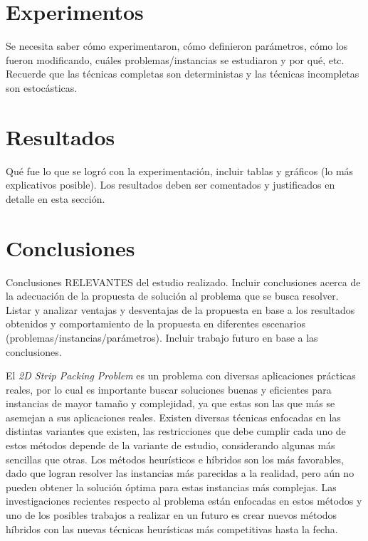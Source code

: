 \documentclass[letter, 10pt]{article}
\begin{document}
\section{Experimentos}

Se necesita saber c\'omo experimentaron, c\'omo definieron par\'ametros, 
c\'omo los fueron modificando, cu\'ales problemas/instancias se estudiaron y por qu\'e, etc. Recuerde que las t\'ecnicas completas son deterministas y las t\'ecnicas incompletas son estoc\'asticas.

\section{Resultados}

Qu\'e fue lo que se logr\'o con la experimentaci\'on, incluir tablas y gr\'aficos (lo m\'as explicativos posible). Los resultados deben ser comentados y justificados en detalle en esta secci\'on.

\section{Conclusiones}

Conclusiones RELEVANTES del estudio realizado. Incluir conclusiones acerca de la adecuaci\'on de la propuesta de soluci\'on al problema que se busca resolver. Listar y analizar ventajas y desventajas de la propuesta en base a los resultados obtenidos y comportamiento de la propuesta en diferentes escenarios (problemas/instancias/par\'ametros). Incluir trabajo futuro en base a las conclusiones.
\vspace{0.2cm}

El \emph{2D Strip Packing Problem} es un problema con diversas aplicaciones pr\'acticas reales, por lo cual es importante buscar soluciones buenas y eficientes para instancias de mayor tama\~no y complejidad, ya que estas son las que m\'as se asemejan a sus aplicaciones reales. Existen diversas t\'ecnicas enfocadas en las distintas variantes que existen, las restricciones que debe cumplir cada uno de estos m\'etodos depende de la variante de estudio, considerando algunas m\'as sencillas que otras. Los m\'etodos heur\'isticos e h\'ibridos son los m\'as favorables, dado que logran resolver las instancias m\'as parecidas a la realidad, pero a\'un no pueden obtener la soluci\'on \'optima para estas instancias m\'as complejas. Las investigaciones recientes respecto al problema est\'an enfocadas en estos m\'etodos y uno de los posibles trabajos a realizar en un futuro es crear nuevos m\'etodos h\'ibridos con las nuevas t\'ecnicas heur\'isticas m\'as competitivas hasta la fecha. 



\end{document}
